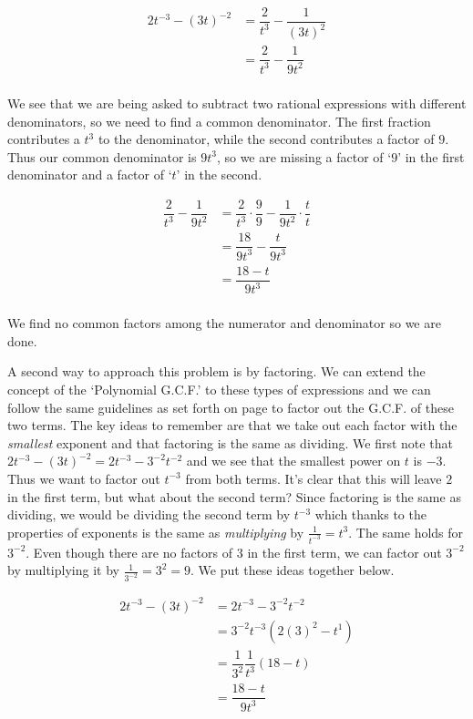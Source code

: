 \begin{ex}
\begin{enumerate}
\begin{align*}
2t^{-3} - (3t)^{-2} & = \dfrac{2}{t^3} - \dfrac{1}{(3t)^2} \\ 
& = \dfrac{2}{t^3} - \dfrac{1}{9t^2} \\
\end{align*}
										
We see that we are being asked to subtract two rational expressions with different denominators, so we need to find a common denominator.  The first fraction contributes a $t^3$ to the denominator, while the second contributes a factor of $9$.  Thus our common denominator is $9t^3$, so we are missing a factor of `$9$' in the first denominator and a factor of `$t$' in the second.

\begin{align*}
\dfrac{2}{t^3} - \dfrac{1}{9t^2} & =  \dfrac{2}{t^3} \cdot \dfrac{9}{9} - \dfrac{1}{9t^2} \cdot \dfrac{t}{t} \tag{Equivalent Fractions} \\ 
& =  \dfrac{18}{9t^3} - \dfrac{t}{9t^3} \tag{Multiply}\\ 
& = \dfrac{18 - t}{9t^3} \tag{Subtract} \\
\end{align*}

We find no common factors among the numerator and denominator so we are done.  

A second way to approach this problem is by factoring.  We can extend the concept of the `Polynomial G.C.F.' to these types of expressions and we can follow the same guidelines as set forth on page \pageref{PolynomialGCF} to factor out the G.C.F. of these two terms.  The key ideas to remember are that we take out each factor with the \textit{smallest} exponent and that factoring is the same as dividing.  We first note that $2t^{-3} - (3t)^{-2}=  2t^{-3} - 3^{-2} t^{-2}$ and we see that the smallest power on $t$ is $-3$. Thus we want to factor out $t^{-3}$ from both terms.  It's clear that this will leave $2$ in the first term, but what about the second term?  Since factoring is the same as dividing, we would be dividing the second term by $t^{-3}$ which thanks to the properties of exponents is the same as \textit{multiplying} by $\frac{1}{t^{-3}} = t^3$.  The same holds for $3^{-2}$.  Even though there are no factors of $3$ in the first term, we can factor out $3^{-2}$ by multiplying it by $\frac{1}{3^{-2}} = 3^2 = 9$. We put these ideas together below.

\begin{align*}
2t^{-3} - (3t)^{-2} & = 2t^{-3} - 3^{-2} t^{-2} \tag{Properties of Exponents} \\ 
& = 3^{-2} t^{-3} (2(3)^2 - t^{1}) \tag{Factor} \\ 
& = \dfrac{1}{3^2} \dfrac{1}{t^3} (18 - t) \tag{Rewrite}\\ 
& = \dfrac{18-t}{9t^3} \tag{Multiply} \\
\end{align*}
																							

\end{enumerate}
\end{ex}
